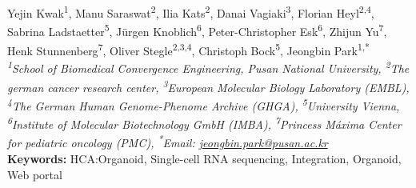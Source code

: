 \begin{center}
Yejin Kwak\href{https://orcid.org/0009-0006-0892-9211}{\textcolor{orcidlogocol}{\aiOrcid}}\textsuperscript{1}, Manu Saraswat\href{https://orcid.org/0000-0002-1472-8049}{\textcolor{orcidlogocol}{\aiOrcid}}\textsuperscript{2}, Ilia Kats\href{https://orcid.org/0000-0001-5220-5671}{\textcolor{orcidlogocol}{\aiOrcid}}\textsuperscript{2}, Danai Vagiaki\href{https://orcid.org/0000-0002-1674-5141}{\textcolor{orcidlogocol}{\aiOrcid}}\textsuperscript{3}, Florian Heyl\href{https://orcid.org/0000-0002-3651-5685}{\textcolor{orcidlogocol}{\aiOrcid}}\textsuperscript{2,4}, Sabrina Ladstaetter\href{https://orcid.org/0000-0001-5773-5436}{\textcolor{orcidlogocol}{\aiOrcid}}\textsuperscript{5}, Jürgen Knoblich\href{https://orcid.org/0000-0002-6751-3404}{\textcolor{orcidlogocol}{\aiOrcid}}\textsuperscript{6}, Peter-Christopher Esk\textsuperscript{6}, Zhijun Yu\textsuperscript{7}, Henk Stunnenberg\href{https://orcid.org/0000-0002-0066-1576}{\textcolor{orcidlogocol}{\aiOrcid}}\textsuperscript{7}, Oliver Stegle\href{https://orcid.org/0000-0002-8818-7193}{\textcolor{orcidlogocol}{\aiOrcid}}\textsuperscript{2,3,4}, Christoph Bock\href{https://orcid.org/0000-0001-6091-3088}{\textcolor{orcidlogocol}{\aiOrcid}}\textsuperscript{5}, Jeongbin Park\href{https://orcid.org/0000-0002-9064-4912}{\textcolor{orcidlogocol}{\aiOrcid}}\textsuperscript{1,*} \\
\vspace{0.2cm}
\textit{\textsuperscript{1}School of Biomedical Convergence Engineering, Pusan National University, \textsuperscript{2}The german cancer research center, \textsuperscript{3}European Molecular Biology Laboratory (EMBL), \textsuperscript{4}The German Human Genome-Phenome Archive (GHGA), \textsuperscript{5}University Vienna, \textsuperscript{6}Institute of Molecular Biotechnology GmbH (IMBA), \textsuperscript{7}Princess Máxima Center for pediatric oncology (PMC), \textsuperscript{*}Email: \href{mailto:jeongbin.park@pusan.ac.kr}{jeongbin.park@pusan.ac.kr}} \\
\vspace{0.2cm}
\textbf{Keywords:} HCA:Organoid, Single-cell RNA sequencing, Integration, Organoid, Web portal
\end{center}

